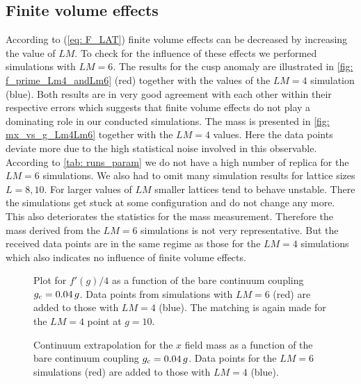 \subsection*{Finite volume effects}
According to (\ref{eq: F_LAT}) finite volume effects can be decreased by increasing the value of $LM$. To check for the influence of these effects we performed simulations with $LM=6$. The results for the cusp anomaly are illustrated in \autoref{fig: f_prime_Lm4_andLm6} (red) together with the values of the $LM=4$ simulation (blue). Both results are in very good agreement with each other within their respective errors which suggests that finite volume effects do not play a dominating role in our conducted simulations. The mass is presented in \autoref{fig: mx_vs_g_Lm4Lm6} together with the $LM=4$ values. Here the data points deviate more due to the high statistical noise involved in this observable. According to \autoref{tab: runs_param} we do not have a high number of replica for the $LM=6$ simulations. We also had to omit many simulation results for lattice sizes $L=8,10$. For larger values of $LM$ smaller lattices tend to behave unstable. There the simulations get stuck at some configuration and do not change any more. This also deteriorates the statistics for the mass measurement. Therefore the mass derived from the $LM=6$ simulations is not very representative. But the received data points are in the same regime as those for the $LM=4$ simulations which also indicates no influence of finite volume effects.
%
%
%
\begin{figure}
\centering

\caption{Plot for $f'(g)/4$ as a function of the bare continuum coupling $g_{\rm c}=0.04\,g$. Data points from simulations with $LM=6$ (red) are added to those with $LM=4$ (blue). The matching is again made for the $LM=4$ point at $g=10$.
\label{fig: f_prime_Lm4_andLm6}}
\end{figure}
%
%
%
\begin{figure}
\centering

\caption{Continuum extrapolation for the $x$ field mass as a function of the bare continuum coupling $g_{\rm c}=0.04\,g$. Data points for the $LM=6$ simulations (red) are added to those with $LM=4$ (blue).
\label{fig: mx_vs_g_Lm4Lm6}}
\end{figure}
%
%
%
